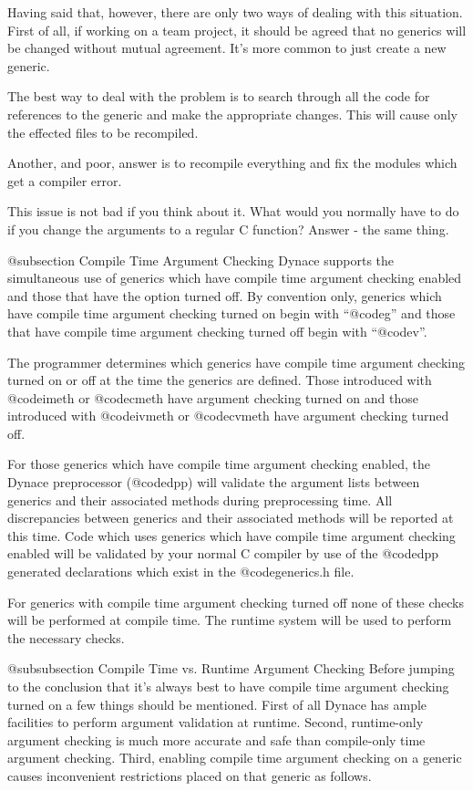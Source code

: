 Having said that, however, there are only two ways of dealing with
this situation.  First of all, if working on a team project, it should
be agreed that no generics will be changed without mutual agreement.
It's more common to just create a new generic.

The best way to deal with the problem is to search through all the
code for references to the generic and make the appropriate changes.
This will cause only the effected files to be recompiled.

Another, and poor, answer is to recompile everything and fix the modules
which get a compiler error.

This issue is not bad if you think about it.  What would you normally
have to do if you change the arguments to a regular C function?  Answer -
the same thing.

@subsection Compile Time Argument Checking
Dynace supports the simultaneous use of generics which have compile
time argument checking enabled and those that have the option
turned off.  By convention only, generics which have compile time
argument checking turned on begin with ``@code{g}'' and those that
have compile time argument checking turned off begin with ``@code{v}''. 

The programmer determines which generics have compile time argument checking
turned on or off at the time the generics are defined.  Those introduced
with @code{imeth} or @code{cmeth} have argument checking turned on and
those introduced with @code{ivmeth} or @code{cvmeth} have argument checking
turned off.

For those generics which have compile time argument checking enabled,
the Dynace preprocessor (@code{dpp}) will validate the argument lists
between generics and their associated methods during preprocessing time.
All discrepancies between generics and their associated methods will be
reported at this time.  Code which uses generics which have compile time
argument checking enabled will be validated by your normal C compiler by
use of the @code{dpp} generated declarations which exist in the
@code{generics.h} file.

For generics with compile time argument checking turned off none of
these checks will be performed at compile time.  The runtime system
will be used to perform the necessary checks.

@subsubsection Compile Time vs. Runtime Argument Checking
Before jumping to the conclusion that it's always best to have compile
time argument checking turned on a few things should be mentioned.
First of all Dynace has ample facilities to perform argument validation
at runtime.  Second, runtime-only argument checking is much more accurate
and safe than compile-only time argument checking.  Third, enabling
compile time argument checking on a generic causes inconvenient
restrictions placed on that generic as follows.

